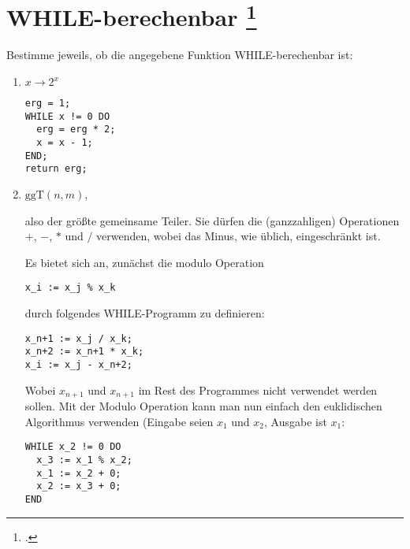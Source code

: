\documentclass{lehramt-informatik-aufgabe}
\begin{document}
\section{WHILE-berechenbar
\footcite[Aufgabe 2]{theo:ab:4}}

Bestimme jeweils, ob die angegebene Funktion WHILE-berechenbar ist:

\begin{enumerate}


\item $x \rightarrow 2^x$

\begin{liAntwort}
\begin{verbatim}
erg = 1;
WHILE x != 0 DO
  erg = erg * 2;
  x = x - 1;
END;
return erg;
\end{verbatim}
\end{liAntwort}


\item $\text{ggT}(n, m)$,

also der größte gemeinsame Teiler. Sie dürfen die (ganzzahligen)
Operationen $+$, $−$, $*$ und $/$ verwenden, wobei das Minus, wie
üblich, eingeschränkt ist.

\begin{liAntwort}
Es bietet sich an, zunächst die modulo Operation

\begin{verbatim}
x_i := x_j % x_k
\end{verbatim}

durch folgendes WHILE-Programm zu definieren:

\begin{verbatim}
x_n+1 := x_j / x_k;
x_n+2 := x_n+1 * x_k;
x_i := x_j - x_n+2;
\end{verbatim}

Wobei $x_{n+1}$ und $x_{n+1}$ im Rest des Programmes nicht verwendet
werden sollen. Mit der Modulo Operation kann man nun \zB einfach den
euklidischen Algorithmus verwenden (Eingabe seien $x_1$ und $x_2$,
Ausgabe ist $x_1$:

\begin{verbatim}
WHILE x_2 != 0 DO
  x_3 := x_1 % x_2;
  x_1 := x_2 + 0;
  x_2 := x_3 + 0;
END
\end{verbatim}
\end{liAntwort}



\end{enumerate}
\end{document}
